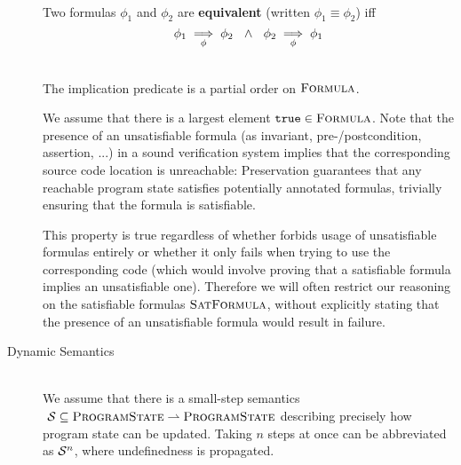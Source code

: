 \begin{description}
    \begin{definition}~\\
        Two formulas $\phi_1$ and $\phi_2$ are \textbf{equivalent} (written $\phi_1 \equiv \phi_2$) iff
        \begin{displaymath}
        {\phi_1} \underset{\phi}{\implies} {\phi_2} ~~\wedge~~ {\phi_2} \underset{\phi}{\implies} {\phi_1}
        \end{displaymath}
    \end{definition} 
    
    
    \begin{lemma}~\\
        The implication predicate is a partial order on $\textsc{Formula}$.
    \end{lemma}
    
    We assume that there is a largest element $\texttt{true} \in \textsc{Formula}$.
    Note that the presence of an unsatisfiable formula (as invariant, pre-/postcondition, assertion, ...) in a sound verification system implies that the corresponding source code location is unreachable:
    Preservation guarantees that any reachable program state satisfies potentially annotated formulas, trivially ensuring that the formula is satisfiable.
    
    This property is true regardless of whether \svl forbids usage of unsatisfiable formulas entirely or whether it only fails when trying to use the corresponding code (which would involve proving that a satisfiable formula implies an unsatisfiable one).
    Therefore we will often restrict our reasoning on the satisfiable formulas $\textsc{SatFormula}$, without explicitly stating that the presence of an unsatisfiable formula would result in failure.
    
    
\item[Dynamic Semantics]~\\
    We assume that there is a small-step semantics $~\mathcal{S} \subseteq \textsc{ProgramState} \rightharpoonup \textsc{ProgramState}$ describing precisely how program state can be updated.
    Taking $n$ steps at once can be abbreviated as $\mathcal{S}^n$, where undefinedness is propagated.
    

\end{description}
